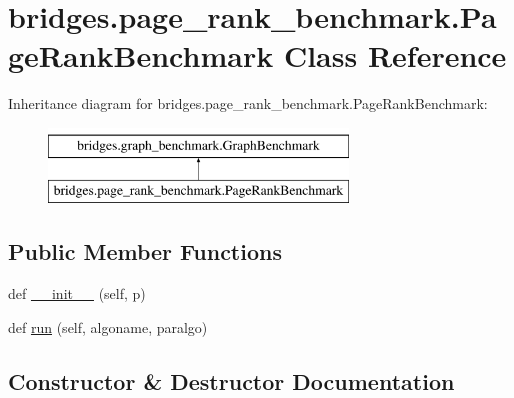 \hypertarget{classbridges_1_1page__rank__benchmark_1_1_page_rank_benchmark}{}\section{bridges.\+page\+\_\+rank\+\_\+benchmark.\+Page\+Rank\+Benchmark Class Reference}
\label{classbridges_1_1page__rank__benchmark_1_1_page_rank_benchmark}
Inheritance diagram for bridges.\+page\+\_\+rank\+\_\+benchmark.\+Page\+Rank\+Benchmark\+:\begin{figure}[H]
\begin{center}
\leavevmode
\includegraphics[height=2.000000cm]{classbridges_1_1page__rank__benchmark_1_1_page_rank_benchmark}
\end{center}
\end{figure}
\subsection*{Public Member Functions}
\begin{DoxyCompactItemize}
\item 
def \hyperlink{classbridges_1_1page__rank__benchmark_1_1_page_rank_benchmark_a2a0035c029f654ef65feab7a15a19770}{\+\_\+\+\_\+init\+\_\+\+\_\+} (self, p)
\item 
def \hyperlink{classbridges_1_1page__rank__benchmark_1_1_page_rank_benchmark_ab1e8da6b9ec3e3858f23bcffb42c5f6c}{run} (self, algoname, paralgo)
\end{DoxyCompactItemize}


\subsection{Constructor \& Destructor Documentation}
\mbox{\label{classbridges_1_1page__rank__benchmark_1_1_page_rank_benchmark_a2a0035c029f654ef65feab7a15a19770}} 
